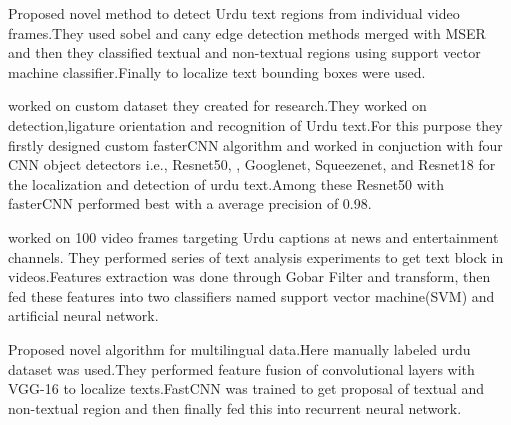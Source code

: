 \documentclass[final]{cvpr}
\begin{document}
\cite{urdu-mehran}Proposed novel method to detect Urdu text regions from individual video frames.They used sobel and cany edge detection methods merged with MSER and then they classified textual and non-textual regions using support vector machine classifier.Finally to localize text bounding boxes were used.

\cite{fastcnn}worked on custom dataset they created for research.They worked on detection,ligature orientation and recognition of Urdu text.For this purpose they firstly designed custom fasterCNN algorithm and worked in conjuction with four CNN object detectors i.e.,  Resnet50, , Googlenet, Squeezenet, and Resnet18 for the localization and detection of urdu text.Among these Resnet50 with fasterCNN performed best with a average precision of 0.98.

\cite{urducaption}worked on 100 video frames targeting Urdu captions at news and entertainment channels. They performed series of text analysis experiments to get text block in videos.Features extraction was done through Gobar Filter and transform, then fed these features into two classifiers named support vector machine(SVM) and artificial neural network.

\cite{conv}Proposed novel algorithm for multilingual data.Here manually labeled urdu dataset was used.They performed feature fusion of convolutional layers with VGG-16 to localize texts.FastCNN was trained to get proposal of textual and non-textual region and then finally fed this into recurrent neural network.









{\small


}
\end{document}
